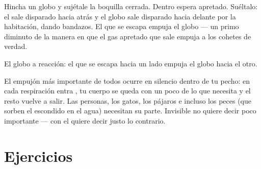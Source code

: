 \begin{example}\label{ex:g2:air-around-us:balloon}
Hincha un globo y sujétale la boquilla cerrada. Dentro espera 
apretado. Suéltalo: el  sale disparado hacia atrás y el globo
sale disparado hacia delante por la habitación, dando bandazos. El
 que se escapa empuja el globo --- un primo diminuto de la
manera en que el gas apretado que sale empuja a los cohetes de verdad.
\end{example}

\begin{omfigure}

{\small El globo a reacción: el  que se escapa hacia un lado
empuja el globo hacia el otro.}
\end{omfigure}

\begin{remark}\label{rem:g2:air-around-us:breathe}
El empujón más importante de todos ocurre en silencio dentro de tu
pecho: en cada respiración entra , tu cuerpo se queda con un poco
de lo que necesita y el resto vuelve a salir. Las personas, los gatos,
los pájaros e incluso los peces (que sorben el  escondido en el
agua) necesitan su parte. Invisible no quiere decir poco importante
--- con el  quiere decir justo lo contrario.
\end{remark}

\section{Ejercicios}


